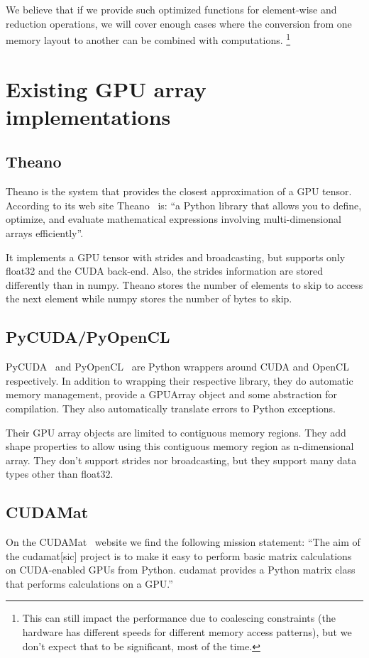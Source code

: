 \documentclass{article} %
\begin{document}
We believe that if we provide such optimized functions for element-wise and reduction operations, we will cover enough cases where the conversion from one memory layout to another can be combined with computations.
\footnote{This can still impact the performance due to coalescing constraints (the hardware has different speeds for different memory access patterns), but we don't expect that to be significant, most of the time.}

\section{Existing GPU array implementations}
\subsection{Theano}
Theano is the system that provides the closest approximation of a GPU tensor. 
According to its web site Theano~\citep{bergstra+al:2010-scipy} is: ``a Python library that allows you to define, optimize, and evaluate mathematical expressions involving multi-dimensional arrays efficiently''.

It implements a GPU tensor with strides and broadcasting, but supports only float32 and the CUDA back-end.
Also, the strides information are stored differently than in numpy.
Theano stores the number of elements to skip to access the next element while numpy stores the number of bytes to skip.

\subsection{PyCUDA/PyOpenCL}
PyCUDA~\citep{kloeckner_pycuda_2009} and PyOpenCL~\citep{kloeckner_pycuda_2009} are Python wrappers around CUDA and OpenCL respectively.
In addition to wrapping their respective library, they do automatic memory management, provide a GPUArray object and some abstraction for compilation.
They also automatically translate errors to Python exceptions.

Their GPU array objects are limited to contiguous memory regions.
They add shape properties to allow using this contiguous memory region as n-dimensional array.
They don't support strides nor broadcasting, but they support many data types other than float32.

\subsection{CUDAMat}
On the CUDAMat~\citep{cudamat-TR2009} website we find the following mission statement: ``The aim of the cudamat[sic] project is to make it easy to perform basic matrix calculations on CUDA-enabled GPUs from Python. cudamat provides a Python matrix class that performs calculations on a GPU.''
\end{document}
